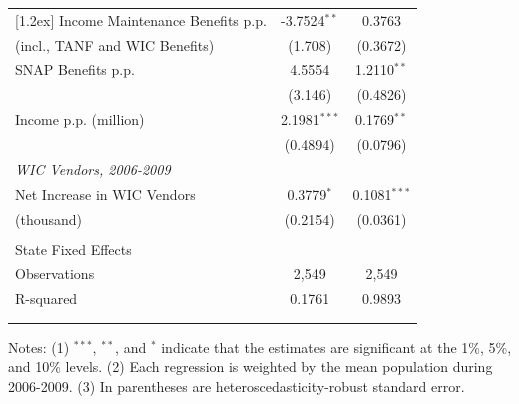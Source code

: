\begin{table}[!htbp]
\begin{center}
\begin{tabular}{@{\extracolsep{0pt}}lcc }
			[1.2ex]
			\hspace{12pt} Income Maintenance Benefits p.p. & -3.7524$^{**}$ & 0.3763 \\ 
			\hspace{24pt} (incl., TANF and WIC Benefits)  & (1.708)     & (0.3672)\\  
			[1.2ex]
			\hspace{12pt} SNAP Benefits p.p. & 4.5554 & 1.2110$^{**}$ \\ 
			& (3.146)      & (0.4826)\\ 
			[1.2ex]
			\hspace{12pt} Income p.p. (million) & 2.1981$^{***}$ & 0.1769$^{**}$ \\ 
			& (0.4894)        & (0.0796)\\
			[1.2ex]
			\multicolumn{3}{l}{\textit{WIC Vendors, 2006-2009}} \\ 
			[1.2ex]
			\hspace{12pt} Net Increase in WIC Vendors & 0.3779$^{*}$ & 0.1081$^{***}$ \\ 
			
			\hspace{24pt} (thousand)  & (0.2154)        & (0.0361)\\   
			& & \\ 
			State Fixed Effects &  & \checkmark \\ 
			Observations & 2,549 & 2,549 \\ 
			R-squared & 0.1761 & 0.9893 \\ 
			\hline \\[-1.8ex] 
			\hline 
			\hline \\ [-5.0ex] 
		\end{tabular} 
	\end{center}
	\footnotesize
	Notes: (1) $^{***}$, $^{**}$, and $^{*}$ indicate that the estimates are significant at the 1\%, 5\%, and 10\% levels. (2) Each regression is weighted by the mean population during 2006-2009. (3) In parentheses are heteroscedasticity-robust standard error.
\end{table}



